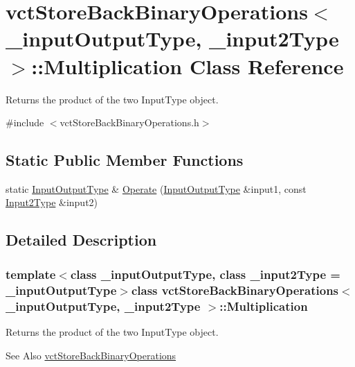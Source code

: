 \hypertarget{classvct_store_back_binary_operations_1_1_multiplication}{\section{vct\-Store\-Back\-Binary\-Operations$<$ \-\_\-input\-Output\-Type, \-\_\-input2\-Type $>$\-:\-:Multiplication Class Reference}
\label{classvct_store_back_binary_operations_1_1_multiplication}
}


Returns the product of the two Input\-Type object.  




{\ttfamily \#include $<$vct\-Store\-Back\-Binary\-Operations.\-h$>$}

\subsection*{Static Public Member Functions}
\begin{DoxyCompactItemize}
\item 
static \hyperlink{classvct_store_back_binary_operations_a9dc481d9e1345541dd5d833d5e5688f3}{Input\-Output\-Type} \& \hyperlink{classvct_store_back_binary_operations_1_1_multiplication_a3d06c22164e5dbe0d4c8dc123f485d65}{Operate} (\hyperlink{classvct_store_back_binary_operations_a9dc481d9e1345541dd5d833d5e5688f3}{Input\-Output\-Type} \&input1, const \hyperlink{classvct_store_back_binary_operations_a65a7197563c794a879fb50a406e70c8f}{Input2\-Type} \&input2)
\end{DoxyCompactItemize}


\subsection{Detailed Description}
\subsubsection*{template$<$class \-\_\-input\-Output\-Type, class \-\_\-input2\-Type = \-\_\-input\-Output\-Type$>$class vct\-Store\-Back\-Binary\-Operations$<$ \-\_\-input\-Output\-Type, \-\_\-input2\-Type $>$\-::\-Multiplication}

Returns the product of the two Input\-Type object. 

\begin{DoxySeeAlso}{See Also}
\hyperlink{classvct_store_back_binary_operations}{vct\-Store\-Back\-Binary\-Operations} 
\end{DoxySeeAlso}


